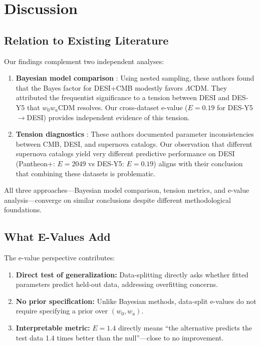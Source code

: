 \documentclass[11pt,a4paper]{article}
\newcommand{\LCDM}{$\Lambda$CDM}
\begin{document}
\section{Discussion}
\label{sec:discussion}

\subsection{Relation to Existing Literature}

Our findings complement two independent analyses:

\begin{enumerate}
    \item \textbf{Bayesian model comparison} \citep{OngBayesian2025}: Using nested sampling, these authors found that the Bayes factor for DESI+CMB modestly favors \LCDM{}. They attributed the frequentist significance to a tension between DESI and DES-Y5 that $w_0w_a$CDM resolves. Our cross-dataset e-value ($E = 0.19$ for DES-Y5$\rightarrow$DESI) provides independent evidence of this tension.

    \item \textbf{Tension diagnostics} \citep{WangMota2025}: These authors documented parameter inconsistencies between CMB, DESI, and supernova catalogs. Our observation that different supernova catalogs yield very different predictive performance on DESI (Pantheon+: $E = 2049$ vs DES-Y5: $E = 0.19$) aligns with their conclusion that combining these datasets is problematic.
\end{enumerate}

All three approaches---Bayesian model comparison, tension metrics, and e-value analysis---converge on similar conclusions despite different methodological foundations.

\subsection{What E-Values Add}

The e-value perspective contributes:
\begin{enumerate}
    \item \textbf{Direct test of generalization:} Data-splitting directly asks whether fitted parameters predict held-out data, addressing overfitting concerns.

    \item \textbf{No prior specification:} Unlike Bayesian methods, data-split e-values do not require specifying a prior over $(w_0, w_a)$.

    \item \textbf{Interpretable metric:} $E = 1.4$ directly means ``the alternative predicts the test data 1.4 times better than the null''---close to no improvement.
\end{enumerate}
\end{document}
